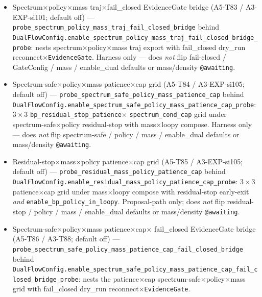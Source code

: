 \documentclass[11pt]{article}
\begin{document}
\begin{itemize}[leftmargin=1.5em]
  for each \texttt{spectrum\_cond\_cap} runs mass$\times$loopy compose
  with residual-stop early-exit \emph{and}
  \texttt{enable\_bp\_policy\_in\_loopy}. Proposal-path only; does
  \emph{not} flip residual-stop / policy / mass / enable\_dual defaults
  or mass/density \texttt{@awaiting}.
  \item Spectrum$\times$policy$\times$mass traj$\times$fail\_closed
  EvidenceGate bridge (A5-T83 / A3-EXP-si101; default off) ---
  \texttt{probe\_spectrum\_policy\_mass\_traj\_fail\_closed\_bridge}
  behind
  \texttt{DualFlowConfig.enable\_spectrum\_policy\_mass\_traj\_fail\_closed\_bridge\_probe}:
  nests spectrum$\times$policy$\times$mass traj export with fail\_closed
  dry\_run reconnect$\times$\texttt{EvidenceGate}. Harness only --- does
  \emph{not} flip fail-closed / GateConfig / mass / enable\_dual
  defaults or mass/density \texttt{@awaiting}.
  \item Spectrum-safe$\times$policy$\times$mass patience$\times$cap grid
  (A5-T84 / A3-EXP-si105; default off) ---
  \texttt{probe\_spectrum\_safe\_policy\_mass\_patience\_cap} behind
  \texttt{DualFlowConfig.enable\_spectrum\_safe\_policy\_mass\_patience\_cap\_probe}:
  $3{\times}3$ \texttt{bp\_residual\_stop\_patience}$\times$
  \texttt{spectrum\_cond\_cap} grid under spectrum-safe$\times$policy
  residual-stop with mass$\times$loopy compose. Harness only --- does
  \emph{not} flip spectrum-safe / policy / mass / enable\_dual defaults
  or mass/density \texttt{@awaiting}.
  \item Residual-stop$\times$mass$\times$policy patience$\times$cap grid
  (A5-T85 / A3-EXP-si105; default off) ---
  \texttt{probe\_residual\_mass\_policy\_patience\_cap} behind
  \texttt{DualFlowConfig.enable\_residual\_mass\_policy\_patience\_cap\_probe}:
  $3{\times}3$ patience$\times$cap grid under mass$\times$loopy compose
  with residual-stop early-exit \emph{and}
  \texttt{enable\_bp\_policy\_in\_loopy}. Proposal-path only; does
  \emph{not} flip residual-stop / policy / mass / enable\_dual defaults
  or mass/density \texttt{@awaiting}.
  \item Spectrum-safe$\times$policy$\times$mass patience$\times$cap$\times$
  fail\_closed EvidenceGate bridge (A5-T86 / A3-T88; default off) ---
  \texttt{probe\_spectrum\_safe\_policy\_mass\_patience\_cap\_fail\_closed\_bridge}
  behind
  \texttt{DualFlowConfig.enable\_spectrum\_safe\_policy\_mass\_patience\_cap\_fail\_closed\_bridge\_probe}:
  nests the patience$\times$cap spectrum-safe$\times$policy$\times$mass
  grid with fail\_closed dry\_run reconnect$\times$\texttt{EvidenceGate}.

\end{itemize}
\end{document}
